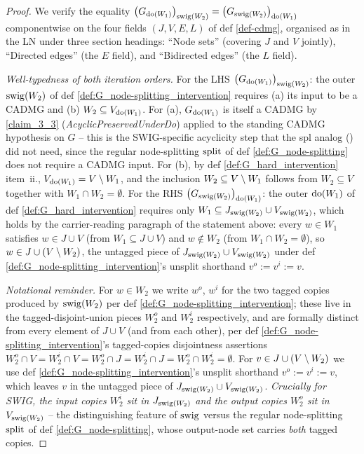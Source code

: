 \documentclass[main]{subfiles}
\begin{document}
\begin{proof}
We verify the equality $\left ( G_{\operatorname{do}(W_1)} \right )_{\mathrm{swig}(W_2)} = \left ( G_{\mathrm{swig}(W_2)} \right )_{\operatorname{do}(W_1)}$ componentwise on the four fields $(J, V, E, L)$ of def \ref{def-cdmg}, organised as in the LN under three section headings: ``Node sets'' (covering $J$ and $V$ jointly), ``Directed edges'' (the $E$ field), and ``Bidirected edges'' (the $L$ field).

\smallskip\noindent\emph{Well-typedness of both iteration orders.}
For the LHS $\left ( G_{\operatorname{do}(W_1)} \right )_{\mathrm{swig}(W_2)}$: the outer $\mathrm{swig}(W_2)$ of def \ref{def:G_node-splitting_intervention} requires (a) its input to be a CADMG and (b) $W_2 \subseteq V_{\operatorname{do}(W_1)}$. For (a), $G_{\operatorname{do}(W_1)}$ is itself a CADMG by \ref{claim_3_3} (\emph{AcyclicPreservedUnderDo}) applied to the standing CADMG hypothesis on $G$ -- this is the SWIG-specific acyclicity step that the spl analog () did not need, since the regular node-splitting $\mathrm{split}$ of def \ref{def:G_node-splitting} does not require a CADMG input. For (b), by def \ref{def:G_hard_intervention} item~ii., $V_{\operatorname{do}(W_1)} = V \setminus W_1$, and the inclusion $W_2 \subseteq V \setminus W_1$ follows from $W_2 \subseteq V$ together with $W_1 \cap W_2 = \emptyset$. For the RHS $\left ( G_{\mathrm{swig}(W_2)} \right )_{\operatorname{do}(W_1)}$: the outer $\operatorname{do}(W_1)$ of def \ref{def:G_hard_intervention} requires only $W_1 \subseteq J_{\mathrm{swig}(W_2)} \cup V_{\mathrm{swig}(W_2)}$, which holds by the carrier-reading paragraph of the statement above: every $w \in W_1$ satisfies $w \in J \cup V$ (from $W_1 \subseteq J \cup V$) and $w \notin W_2$ (from $W_1 \cap W_2 = \emptyset$), so $w \in J \cup (V \setminus W_2)$, the untagged piece of $J_{\mathrm{swig}(W_2)} \cup V_{\mathrm{swig}(W_2)}$ under def \ref{def:G_node-splitting_intervention}'s unsplit shorthand $v^o := v^i := v$.

\smallskip\noindent\emph{Notational reminder.}
For $w \in W_2$ we write $w^o$, $w^i$ for the two tagged copies produced by $\mathrm{swig}(W_2)$ per def \ref{def:G_node-splitting_intervention}; these live in the tagged-disjoint-union pieces $W_2^o$ and $W_2^i$ respectively, and are formally distinct from every element of $J \cup V$ (and from each other), per def \ref{def:G_node-splitting_intervention}'s tagged-copies disjointness assertions $W_2^o \cap V = W_2^i \cap V = W_2^o \cap J = W_2^i \cap J = W_2^o \cap W_2^i = \emptyset$. For $v \in J \cup (V \setminus W_2)$ we use def \ref{def:G_node-splitting_intervention}'s unsplit shorthand $v^o := v^i := v$, which leaves $v$ in the untagged piece of $J_{\mathrm{swig}(W_2)} \cup V_{\mathrm{swig}(W_2)}$. \emph{Crucially for SWIG, the input copies $W_2^i$ sit in $J_{\mathrm{swig}(W_2)}$ and the output copies $W_2^o$ sit in $V_{\mathrm{swig}(W_2)}$} -- the distinguishing feature of $\mathrm{swig}$ versus the regular node-splitting $\mathrm{split}$ of def \ref{def:G_node-splitting}, whose output-node set carries \emph{both} tagged copies.


\end{proof}
\end{document}

